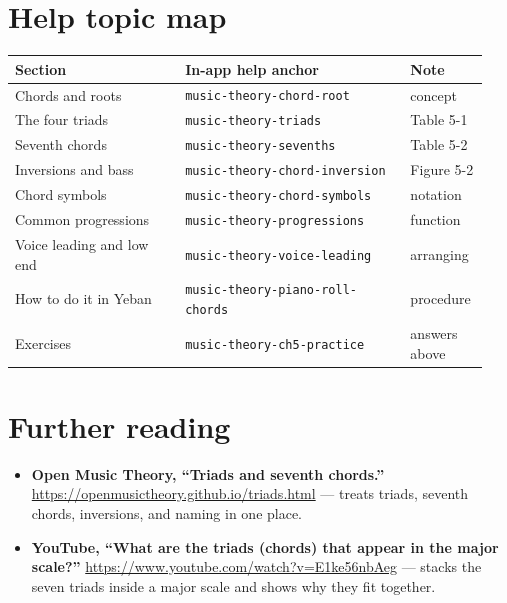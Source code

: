 \section{Help topic map}

\begin{center}
\footnotesize
\setlength{\tabcolsep}{3pt}
\begin{longtable}{p{0.34\linewidth}p{0.45\linewidth}p{0.15\linewidth}}
\toprule
Section & In-app help anchor & Note \\
\midrule
\endhead
Chords and roots & \texttt{music-theory-chord-root} & concept \\
The four triads & \texttt{music-theory-triads} & Table 5-1 \\
Seventh chords & \texttt{music-theory-sevenths} & Table 5-2 \\
Inversions and bass & \texttt{music-theory-chord-inversion} & Figure 5-2 \\
Chord symbols & \texttt{music-theory-chord-symbols} & notation \\
Common progressions & \texttt{music-theory-progressions} & function \\
Voice leading and low end & \texttt{music-theory-voice-leading} & arranging \\
How to do it in Yeban & \texttt{music-theory-piano-roll-chords} & procedure \\
Exercises & \texttt{music-theory-ch5-practice} & answers above \\
\bottomrule
\end{longtable}
\end{center}

\section*{Further reading}
\begin{itemize}
  \item \textbf{Open Music Theory, “Triads and seventh chords.”} \url{https://openmusictheory.github.io/triads.html} — treats triads, seventh chords, inversions, and naming in one place.
  \item \textbf{YouTube, “What are the triads (chords) that appear in the major scale?”} \url{https://www.youtube.com/watch?v=E1ke56nbAeg} — stacks the seven triads inside a major scale and shows why they fit together.
\end{itemize}

